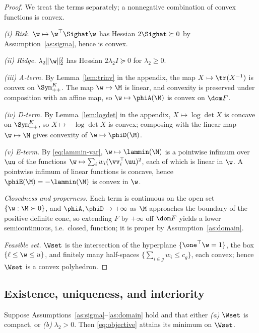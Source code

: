 \begin{proof}
We treat the terms separately; a nonnegative combination of convex functions is
convex.

\emph{(i) Risk.} $\w\mapsto\w^\top\Sighat\w$ has Hessian $2\Sighat\succeq0$ by
Assumption~\ref{as:sigma}, hence is convex.

\emph{(ii) Ridge.} $\lambda_2\lVert\w\rVert_2^2$ has Hessian
$2\lambda_2I\succeq0$ for $\lambda_2\ge0$.

\emph{(iii) A-term.} By Lemma~\ref{lem:trinv} in the appendix, the map
$X\mapsto\tr(X^{-1})$ is convex on $\Sym^{K}_{++}$. The map $\w\mapsto\M$ is
linear, and convexity is preserved under composition with an affine map, so
$\w\mapsto\phiA(\M)$ is convex on $\dom F$.

\emph{(iv) D-term.} By Lemma~\ref{lem:logdet} in the appendix, $X\mapsto\log\det X$
is concave on $\Sym^{K}_{++}$, so $X\mapsto-\log\det X$ is convex; composing with
the linear map $\w\mapsto\M$ gives convexity of $\w\mapsto\phiD(\M)$.

\emph{(v) E-term.} By \eqref{eq:lammin-var}, $\w\mapsto\lammin(\M)$ is a pointwise
infimum over $\uu$ of the functions $\w\mapsto\sum_iw_i(\vv_i^\top\uu)^2$, each of
which is linear in $\w$. A pointwise infimum of linear functions is concave,
hence $\phiE(\M)=-\lammin(\M)$ is convex in $\w$.

\emph{Closedness and properness.} Each term is continuous on the open set
$\{\w:\M\succ0\}$, and $\phiA,\phiD\to+\infty$ as $\M$ approaches the boundary of
the positive definite cone, so extending $F$ by $+\infty$ off $\dom F$ yields a
lower semicontinuous, i.e.\ closed, function; it is proper by
Assumption~\ref{as:domain}.

\emph{Feasible set.} $\Wset$ is the intersection of the hyperplane
$\{\one^\top\w=1\}$, the box $\{\ell\le\w\le u\}$, and finitely many half-spaces
$\{\sum_{i\in g}w_i\le c_g\}$, each convex; hence $\Wset$ is a convex polyhedron.
\end{proof}

\subsection{Existence, uniqueness, and interiority}

\begin{theorem}[Existence]
\label{thm:existence}
Suppose Assumptions~\ref{as:sigma}--\ref{as:domain} hold and that either
\emph{(a)} $\Wset$ is compact, or \emph{(b)} $\lambda_2>0$. Then
\eqref{eq:objective} attains its minimum on $\Wset$.
\end{theorem}

